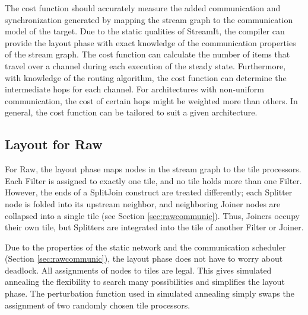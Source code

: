 
The cost function should accurately measure the added communication
and synchronization generated by mapping the stream graph to the
communication model of the target.  Due to the static qualities of
StreamIt, the compiler can provide the layout phase with exact
knowledge of the communication properties of the stream graph.  The
cost function can calculate the number of items that travel over a
channel during each execution of the steady state.  Furthermore, with
knowledge of the routing algorithm, the cost function can determine
the intermediate hops for each channel.  For architectures with
non-uniform communication, the cost of certain hops might be weighted
more than others.  In general, the cost function can be tailored to
suit a given architecture.



\subsection{Layout for Raw}

For Raw, the layout phase maps nodes in the stream graph to the tile
processors.  Each Filter is assigned to exactly one tile, and no tile
holds more than one Filter.  However, the ends of a SplitJoin
construct are treated differently; each Splitter node is folded into
its upstream neighbor, and neighboring Joiner nodes are collapsed into
a single tile (see Section \ref{sec:rawcommunic}).  Thus, Joiners
occupy their own tile, but Splitters are integrated into the tile of
another Filter or Joiner.

Due to the properties of the static network and the communication
scheduler (Section \ref{sec:rawcommunic}), the layout phase does not
have to worry about deadlock.  All assignments of nodes to tiles are
legal.  This gives simulated annealing the flexibility to search many
possibilities and simplifies the layout phase.  The perturbation
function used in simulated annealing simply swaps the assignment of
two randomly chosen tile processors.

